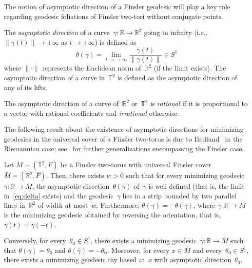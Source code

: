 \documentclass[AHL,Unicode,longabstracts,published]{cedram}
\newcommand{\R}{\mathbb{R}}
\newcommand{\T}{\mathbb{T}}
\newcommand{\ie}{i.e.}
\begin{document}
The notion of asymptotic direction of a Finsler geodesic will play a key role regarding geodesic foliations of Finsler two-tori without conjugate points.

\begin{defi}\label{def:asymptotic}
The \emph{asymptotic direction} of a curve~$\gamma:\R \to \R^2$ going to infinity (\ie, \mbox{$\lVert \gamma(t) \rVert \to +\infty$} as $t \to +\infty$) is defined as
\begin{equation}\label{eq:delta}
\theta(\gamma) = \lim_{t\,\to\,+\infty} \frac{\gamma(t)}{\lVert \gamma(t) \rVert} \in S^1
\end{equation}
where $\lVert \cdot \rVert$ represents the Euclidean norm of~$\R^2$ (if the limit exists). The asymptotic direction of a curve in~$\T^2$ is defined as the asymptotic direction of any of its lifts.

The asymptotic direction of a curve of~$\R^2$ or~$\T^2$ is \emph{rational} if it is proportional to a vector with rational coefficients and \emph{irrational} otherwise.
\end{defi}

The following result about the existence of asymptotic directions for minimizing geodesics in the universal cover of a Finsler two-torus is due to Hedlund~\cite{He32} in the Riemannian case; see~\cite{Ba88,BP86,Ma91,Sch15} for further generalizations encompassing the Finsler case.


\begin{theo}\label{theo:hedlund}
Let $M=(\T^2,F)$ be a Finsler two-torus with universal Finsler cover $\bar{M}=(\R^2,\bar{F})$. Then, there exists $w>0$ such that for every minimizing geodesic $\gamma:\R \to \bar{M}$, the asymptotic direction~$\theta(\gamma)$ of~$\gamma$ is well-defined (that is, the limit in~\eqref{eq:delta} exists) and the geodesic~$\gamma$ lies in a strip bounded by two parallel lines in~$\R^2$ of width at most~$w$. Furthermore, $\theta(\bar{\gamma})=-\theta(\gamma)$, where $\bar{\gamma}:\R \to \bar{M}$ is the minimizing geodesic obtained by reversing the orientation, that is, $\bar{\gamma}(t)=\gamma(-t)$.

Conversely, for every~$\theta_0 \in S^1$, there exists a minimizing geodesic~\mbox{$\gamma:\R \to \bar{M}$} such that \mbox{$\theta(\gamma) = \theta_0$} and \mbox{$\theta(\bar{\gamma}) = -\theta_0$}. Moreover, for every $x \in \bar{M}$ and every~$\theta_0 \in S^1$, there exists a minimizing geodesic ray based at~$x$ with asymptotic direction~$\theta_0$.
\end{theo}
\end{document}
